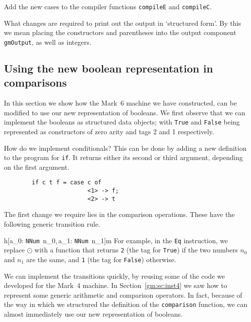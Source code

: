 \begin{exercise}
Add the new cases to the compiler functions \mbox{\tt compileE} and
\mbox{\tt compileC}.
\end{exercise}

\begin{exercise}
What changes are required to print out the output in `structured
form'. By this we mean placing the constructors and parentheses into
the output component \mbox{\tt gmOutput}, as well as integers.
\end{exercise}

\subsection{Using the new boolean representation in
comparisons}

In this section we show how the Mark~6 machine we have constructed,
can be modified to use our new representation of booleans. We first
observe that we can implement the booleans as structured data objects;
with \mbox{\tt True} and \mbox{\tt False} being represented as constructors of zero
arity and tags 2 and 1 respectively.

How do we implement conditionals? This can be done by adding a new
definition to the program for \mbox{\tt if}. It returns either its second or
third argument, depending on the first argument.
\begin{verbatim}
        if c t f = case c of
                        <1> -> f;
                        <2> -> t
\end{verbatim}
The first change we require lies in the comparison operations. These
have the following generic transition rule.

\gmruleod%
{%
{h[a_0: \mbox{\tt NNum}\ n_0,\,a_1: \mbox{\tt NNum}\ n_1]}{m}}%
{}
%
For example, in the \mbox{\tt Eq} instruction, we replace $\odot$ with a
function that returns \mbox{\tt 2} (the tag for \mbox{\tt True}) if the two numbers
$n_0$ and $n_1$ are the same, and \mbox{\tt 1} (the tag for \mbox{\tt False}) otherwise.

We can implement the transitions quickly, by reusing some of the code
we developed for the Mark~4 machine. In Section~\ref{gm:sc:inst4} we
saw how to represent some generic arithmetic and comparison operators.
In fact, because of the way in which we structured the definition of
the \mbox{\tt comparison} function, we can almost immediately use our new
representation of booleans.


